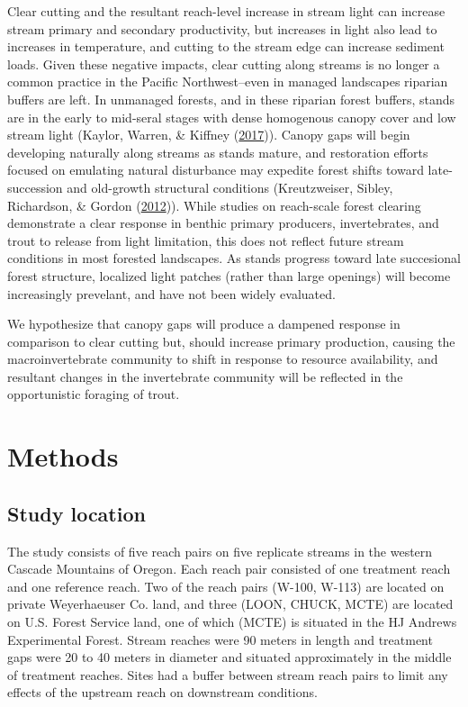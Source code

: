 \documentclass[double,12pt]{beavtex}
\begin{document}
  Clear cutting and the resultant reach-level increase in stream light can
  increase stream primary and secondary productivity, but increases in
  light also lead to increases in temperature, and cutting to the stream
  edge can increase sediment loads. Given these negative impacts, clear
  cutting along streams is no longer a common practice in the Pacific
  Northwest--even in managed landscapes riparian buffers are left. In
  unmanaged forests, and in these riparian forest buffers, stands are in
  the early to mid-seral stages with dense homogenous canopy cover and low
  stream light (Kaylor, Warren, \& Kiffney
  (\protect\hyperlink{ref-Kaylor2017}{2017})). Canopy gaps will begin
  developing naturally along streams as stands mature, and restoration
  efforts focused on emulating natural disturbance may expedite forest
  shifts toward late-succession and old-growth structural conditions
  (Kreutzweiser, Sibley, Richardson, \& Gordon
  (\protect\hyperlink{ref-Kreutzweiser2012}{2012})). While studies on
  reach-scale forest clearing demonstrate a clear response in benthic
  primary producers, invertebrates, and trout to release from light
  limitation, this does not reflect future stream conditions in most
  forested landscapes. As stands progress toward late succesional forest
  structure, localized light patches (rather than large openings) will
  become increasingly prevelant, and have not been widely evaluated.
  
  We hypothesize that canopy gaps will produce a dampened response in
  comparison to clear cutting but, should increase primary production,
  causing the macroinvertebrate community to shift in response to resource
  availability, and resultant changes in the invertebrate community will
  be reflected in the opportunistic foraging of trout.
  
  \chapter*{Methods}\label{methods}
  
  \section*{Study location}\label{study-location}
  
  The study consists of five reach pairs on five replicate streams in the
  western Cascade Mountains of Oregon. Each reach pair consisted of one
  treatment reach and one reference reach. Two of the reach pairs (W-100,
  W-113) are located on private Weyerhaeuser Co. land, and three (LOON,
  CHUCK, MCTE) are located on U.S. Forest Service land, one of which
  (MCTE) is situated in the HJ Andrews Experimental Forest. Stream reaches
  were 90 meters in length and treatment gaps were 20 to 40 meters in
  diameter and situated approximately in the middle of treatment reaches.
  Sites had a buffer between stream reach pairs to limit any effects of
  the upstream reach on downstream conditions.
  
\end{document}
